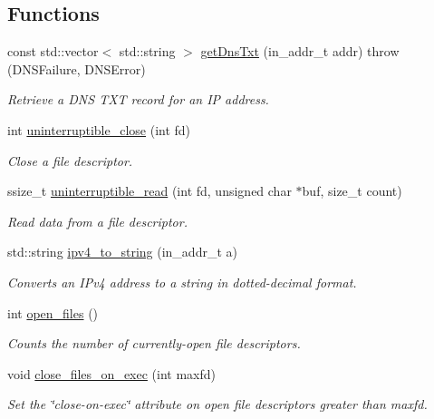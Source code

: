 \subsection*{\-Functions}
\begin{DoxyCompactItemize}
\item 
const std\-::vector$<$ std\-::string $>$ \hyperlink{namespaceLibWheel_ab30bbb7dd8080f582e9b497903565bab}{get\-Dns\-Txt} (in\-\_\-addr\-\_\-t addr)  throw (\-D\-N\-S\-Failure, D\-N\-S\-Error)
\begin{DoxyCompactList}\small\item\em \-Retrieve a \-D\-N\-S \-T\-X\-T record for an \-I\-P address. \end{DoxyCompactList}\item 
int \hyperlink{namespaceLibWheel_a6941e854dd6b671e040bcffd561c22e5}{uninterruptible\-\_\-close} (int fd)
\begin{DoxyCompactList}\small\item\em \-Close a file descriptor. \end{DoxyCompactList}\item 
ssize\-\_\-t \hyperlink{namespaceLibWheel_a5103fe133e672ffe84edc3977969c244}{uninterruptible\-\_\-read} (int fd, unsigned char $\ast$buf, size\-\_\-t count)
\begin{DoxyCompactList}\small\item\em \-Read data from a file descriptor. \end{DoxyCompactList}\item 
std\-::string \hyperlink{namespaceLibWheel_a922fd717077d5a27328412f69c8d9d8c}{ipv4\-\_\-to\-\_\-string} (in\-\_\-addr\-\_\-t a)
\begin{DoxyCompactList}\small\item\em \-Converts an \-I\-Pv4 address to a string in dotted-\/decimal format. \end{DoxyCompactList}\item 
int \hyperlink{namespaceLibWheel_a5f91ec312857b9f968bc17d795bc96e1}{open\-\_\-files} ()
\begin{DoxyCompactList}\small\item\em \-Counts the number of currently-\/open file descriptors. \end{DoxyCompactList}\item 
void \hyperlink{namespaceLibWheel_a941108ec3b987f98a677f78dc36eace0}{close\-\_\-files\-\_\-on\-\_\-exec} (int maxfd)
\begin{DoxyCompactList}\small\item\em \-Set the \char`\"{}close-\/on-\/exec\char`\"{} attribute on open file descriptors greater than {\itshape maxfd\/}. \end{DoxyCompactList}\item 

\end{DoxyCompactItemize}
